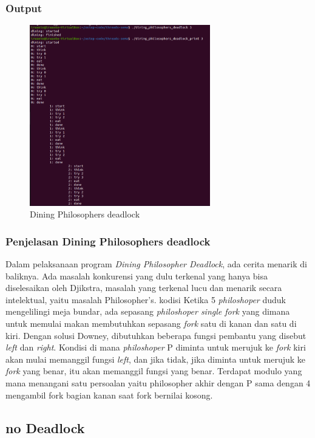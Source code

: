 \documentclass[11pt,a4paper]{article}
\begin{document}
\subsubsection{Output}
\begin{figure}[h]
    \centering
    \includegraphics[width=0.7\textwidth]{Figure/5benar.png}
    \caption{Dining Philosophers deadlock}
    \label{fig:my_label}
\end{figure}

\subsubsection{Penjelasan Dining Philosophers deadlock}
Dalam pelaksanaan program \textit{Dining Philosopher Deadlock}, ada cerita menarik di baliknya. Ada masalah konkurensi yang dulu terkenal yang hanya bisa diselesaikan oleh Djikstra, masalah yang terkenal lucu dan menarik secara intelektual, yaitu masalah Philosopher's. kodisi Ketika 5 \textit{philoshoper} duduk mengelilingi meja bundar, ada sepasang \textit{philoshoper single fork} yang dimana untuk memulai makan membutuhkan sepasang \textit{fork} satu di kanan dan satu di kiri. Dengan solusi Downey, dibutuhkan beberapa fungsi pembantu yang disebut \textit{left} dan \textit{right}. Kondisi di mana \textit{philoshoper} P diminta untuk merujuk ke \textit{fork} kiri akan mulai memanggil fungsi \textit{left}, dan jika tidak, jika diminta untuk merujuk ke \textit{fork} yang benar, itu akan memanggil fungsi yang benar.  Terdapat modulo yang mana menangani satu persoalan yaitu philosopher akhir dengan P sama dengan 4 mengambil fork bagian kanan saat fork bernilai kosong.


\subsection{no Deadlock}
\end{document}
